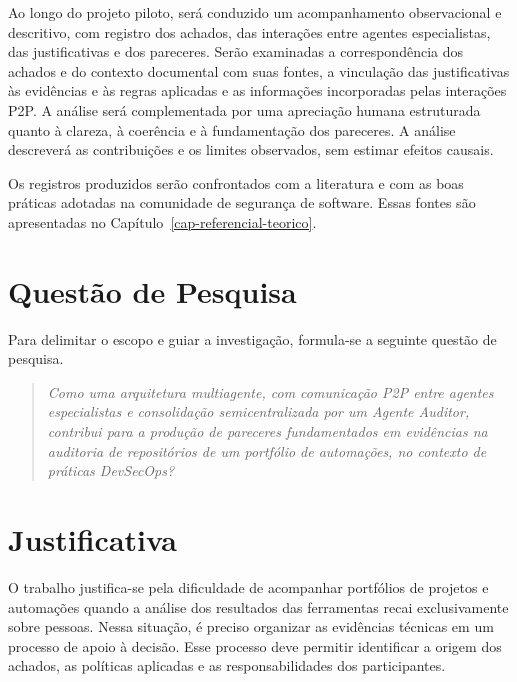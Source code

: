 Ao longo do projeto piloto, será conduzido um acompanhamento observacional e descritivo, com registro dos achados, das interações entre agentes especialistas, das justificativas e dos pareceres. Serão examinadas a correspondência dos achados e do contexto documental com suas fontes, a vinculação das justificativas às evidências e às regras aplicadas e as informações incorporadas pelas interações P2P. A análise será complementada por uma apreciação humana estruturada quanto à clareza, à coerência e à fundamentação dos pareceres. A análise descreverá as contribuições e os limites observados, sem estimar efeitos causais.

Os registros produzidos serão confrontados com a literatura e com as boas práticas adotadas na comunidade de segurança de software. Essas fontes são apresentadas no Capítulo~\ref{cap-referencial-teorico}.

\section{Questão de Pesquisa}
\label{intro-questao}

Para delimitar o escopo e guiar a investigação, formula-se a seguinte questão de pesquisa.

\begin{quote}
\textit{Como uma arquitetura multiagente, com comunicação P2P entre agentes especialistas e consolidação semicentralizada por um Agente Auditor, contribui para a produção de pareceres fundamentados em evidências na auditoria de repositórios de um portfólio de automações, no contexto de práticas DevSecOps?}
\end{quote}

\section{Justificativa}
\label{intro-justificativa}

O trabalho justifica-se pela dificuldade de acompanhar portfólios de projetos e automações quando a análise dos resultados das ferramentas recai exclusivamente sobre pessoas. Nessa situação, é preciso organizar as evidências técnicas em um processo de apoio à decisão. Esse processo deve permitir identificar a origem dos achados, as políticas aplicadas e as responsabilidades dos participantes.

